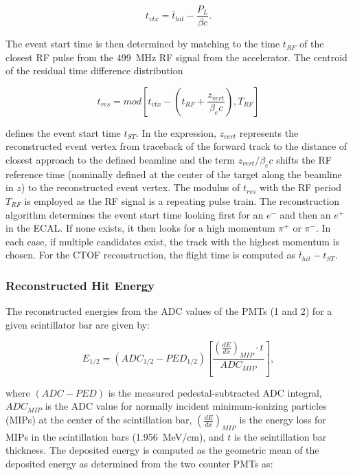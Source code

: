 \begin{equation}
t_{vtx} = \overline{t}_{hit} - \frac{P_L}{\beta c}.
\end{equation}

The event start time is then determined by matching to the time $t_{RF}$ of the closest RF pulse from the
499~MHz RF signal from the accelerator. The centroid of the residual time difference distribution

\begin{equation}
t_{res} = mod \left[ t_{vtx} - \left(t_{RF} + \frac{z_{vert}}{\beta_e c} \right), T_{RF} \right]
\end{equation}

\noindent
defines the event start time $t_{ST}$. In the expression, $z_{vert}$ represents the reconstructed event vertex
from traceback of the forward track to the distance of closest approach to the defined beamline and the term
$z_{vert}/\beta_e c$ shifts the RF reference time (nominally defined at the center of the target along the
beamline in $z$) to the reconstructed event vertex. The modulus of $t_{res} $ with the RF period $T_{RF}$ is
employed as the RF signal is a repeating pulse train. The reconstruction algorithm determines the event start
time looking first for an $e^-$ and then an $e^+$ in the ECAL. If none exists, it then looks for a high momentum
$\pi^+$ or $\pi^-$. In each case, if multiple candidates exist, the track with the highest momentum is chosen.
For the CTOF reconstruction, the flight time is computed as $\bar{t}_{hit} - t_{ST}$.

\subsubsection{Reconstructed Hit Energy}
\label{rec:energy}

The reconstructed energies from the ADC values of the PMTs (1 and 2) for a given scintillator bar are given by:

\begin{equation}
E_{1/2} = (ADC_{1/2} - PED_{1/2}) \left [ \frac{\left( \frac{dE}{dx} \right )_{MIP} \cdot t}{ADC_{MIP}} \right ],
\end{equation}

\noindent
where $(ADC  - PED)$ is the measured pedestal-subtracted ADC integral, $ADC_{MIP}$ is the ADC value for
normally incident minimum-ionizing particles (MIPs) at the center of the scintillation bar,
$\left( \frac{dE}{dx} \right)_{MIP}$ is the energy loss for MIPs in the scintillation bars (1.956~MeV/cm), and
$t$ is the scintillation bar thickness. The deposited energy is computed as the geometric mean of the deposited
energy as determined from the two counter PMTs as:

